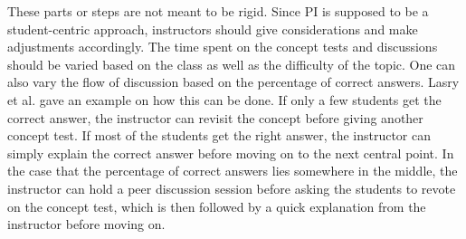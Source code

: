 These parts or steps are not meant to be rigid. Since PI is supposed to be a student-centric approach, instructors should give considerations and make adjustments accordingly. 
The time spent on the concept tests and discussions should be varied based on the class as well as the difficulty of the topic. 
One can also vary the flow of discussion based on the percentage of correct answers. 
Lasry et al. \cite{lasry2008peer} gave an example on how this can be done.
If only a few students get the correct answer, the instructor can revisit the concept before giving another concept test.
If most of the students get the right answer, the instructor can simply explain the correct answer before moving on to the next central point.
In the case that the percentage of correct answers lies somewhere in the middle, the instructor can hold a peer discussion session before asking the students to revote on the concept test, which is then followed by a quick explanation from the instructor before moving on.


